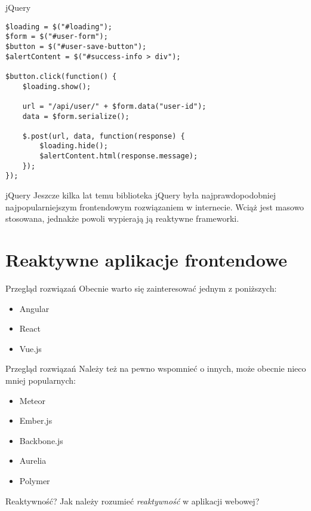 \begin{frame}[fragile]{jQuery}
	\begin{lstlisting}
$loading = $("#loading");
$form = $("#user-form");
$button = $("#user-save-button");
$alertContent = $("#success-info > div");

$button.click(function() {
    $loading.show();

    url = "/api/user/" + $form.data("user-id");
    data = $form.serialize();
    
    $.post(url, data, function(response) {
        $loading.hide();
        $alertContent.html(response.message);
    });
});
	\end{lstlisting}
\end{frame}

\begin{frame}{jQuery}
	Jeszcze kilka lat temu biblioteka jQuery była najprawdopodobniej najpopularniejszym frontendowym rozwiązaniem w internecie. Wciąż jest masowo stosowana, jednakże powoli wypierają ją reaktywne frameworki.
\end{frame}

\section{Reaktywne aplikacje frontendowe}

\begin{frame}{Przegląd rozwiązań}
	Obecnie warto się zainteresować jednym z poniższych:
	\begin{itemize}
	\item Angular
	\item React
	\item Vue.js
	\end{itemize}
\end{frame}

\begin{frame}{Przegląd rozwiązań}
	Należy też na pewno wspomnieć o innych, może obecnie nieco mniej popularnych:
	\begin{itemize}
	\item Meteor
	\item Ember.js
	\item Backbone.js
	\item Aurelia
	\item Polymer
	\end{itemize}
\end{frame}

\begin{frame}{Reaktywność?}
	Jak należy rozumieć \emph{reaktywność} w aplikacji webowej?
\end{frame}

